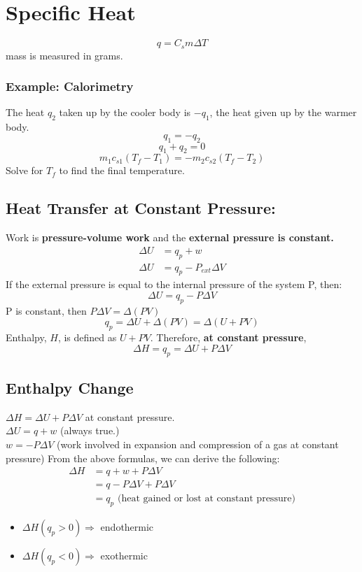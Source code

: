 \documentclass[10pt]{article}
\begin{document}
\section*{Specific Heat}
\[q = C_s m \Delta T\]
mass is measured in grams.

\subsubsection*{Example: Calorimetry}
The heat $q_2$ taken up by the cooler body is $-q_1$, the heat given up by the warmer body.
\[q_1 = -q_2\]
\[q_1 + q_2 = 0\]
\[m_1 c_{s1}(T_f - T_1) = -m_2 c_{s2}(T_f-T_2)\]
Solve for $T_f$ to find the final temperature.

\subsection*{Heat Transfer at Constant Pressure:}
Work is \textbf{pressure-volume work} and the \textbf{external pressure is constant.}
\begin{align*}
    \Delta U &= q_p + w\\
    \Delta U &= q_p - P_{ext} \Delta V
\end{align*}
If the external pressure is equal to the internal pressure of the system P, then:
\[\Delta U = q_p - P\Delta V\]
P is constant, then $P \Delta V = \Delta (PV)$
\[q_p = \Delta U + \Delta(PV) = \Delta(U + PV)\]
Enthalpy, $H$, is defined as $U + PV$.
Therefore, \textbf{at constant pressure}, 
\[\Delta H = q_p = \Delta U + P\Delta V\]

\subsection*{Enthalpy Change}
$\Delta H = \Delta U + P \Delta V$ at constant pressure.\\
$\Delta U = q + w$ (always true.)\\
$w = -P\Delta V$ (work involved in expansion and compression of a gas at constant pressure)
From the above formulas, we can derive the following:
\begin{align*}
    \Delta H &= q + w + P \Delta V\\
    &= q - P \Delta V + P \Delta V\\
    &= q_p \text{ (heat gained or lost at constant pressure)}
\end{align*}
\begin{itemize}
    \item $\Delta H (q_p > 0) \Rightarrow$ endothermic
    \item $\Delta H (q_p < 0) \Rightarrow$ exothermic
\end{itemize}
\end{document}
